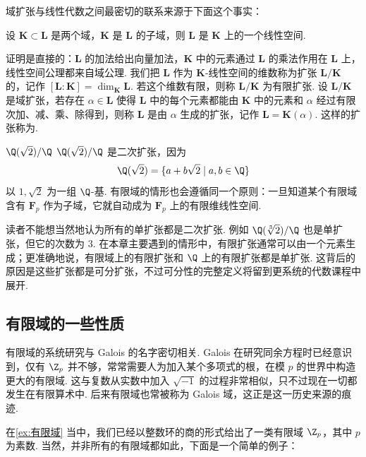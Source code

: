 域扩张与线性代数之间最密切的联系来源于下面这个事实：

\begin{theorem}{}{}
    设 $\mathbf{K} \subset \mathbf{L}$ 是两个域，$\mathbf{K}$ 是 $\mathbf{L}$ 的子域，则 $\mathbf{L}$ 是 $\mathbf{K}$ 上的一个线性空间.
\end{theorem}

证明是直接的：$\mathbf{L}$ 的加法给出向量加法，$\mathbf{K}$ 中的元素通过 $\mathbf{L}$ 的乘法作用在 $\mathbf{L}$ 上，线性空间公理都来自域公理. 我们把 $\mathbf{L}$ 作为 $\mathbf{K}$-线性空间的维数称为扩张 $\mathbf{L}/\mathbf{K}$ 的，记作 $[\mathbf{L}:\mathbf{K}]=\dim_{\mathbf{K}}\mathbf{L}$. 若这个维数有限，则称 $\mathbf{L}/\mathbf{K}$ 为有限扩张. 设 $\mathbf{L}/\mathbf{K}$ 是域扩张，若存在 $\alpha\in\mathbf{L}$ 使得 $\mathbf{L}$ 中的每个元素都能由 $\mathbf{K}$ 中的元素和 $\alpha$ 经过有限次加、减、乘、除得到，则称 $\mathbf{L}$ 是由 $\alpha$ 生成的扩张，记作 $\mathbf{L}=\mathbf{K}(\alpha)$. 这样的扩张称为.

\begin{example}{$\Q(\sqrt{2})/\Q$}{}
    $\Q(\sqrt{2})/\Q$ 是二次扩张，因为
    \[
        \Q(\sqrt{2})=\{a+b\sqrt{2}\mid a,b\in\Q\}
    \]
    以 $1,\sqrt{2}$ 为一组 $\Q$-基. 有限域的情形也会遵循同一个原则：一旦知道某个有限域含有 $\mathbf{F}_p$ 作为子域，它就自动成为 $\mathbf{F}_p$ 上的有限维线性空间.
\end{example}

读者不能想当然地认为所有的单扩张都是二次扩张. 例如 $\Q(\sqrt[3]{2})/\Q$ 也是单扩张，但它的次数为 $3$. 在本章主要遇到的情形中，有限扩张通常可以由一个元素生成；更准确地说，有限域上的有限扩张和 $\Q$ 上的有限扩张都是单扩张. 这背后的原因是这些扩张都是可分扩张，不过可分性的完整定义将留到更系统的代数课程中展开.

\subsection{有限域的一些性质}

有限域的系统研究与 Galois 的名字密切相关. Galois 在研究同余方程时已经意识到，仅有 $\Z_p$ 并不够，常常需要人为加入某个多项式的根，在模 $p$ 的世界中构造更大的有限域. 这与复数从实数中加入 $\sqrt{-1}$ 的过程非常相似，只不过现在一切都发生在有限算术中. 后来有限域也常被称为 Galois 域，这正是这一历史来源的痕迹.

在\autoref{ex:有限域} 当中，我们已经以整数环的商的形式给出了一类有限域 $\Z_p$，其中 $p$ 为素数. 当然，并非所有的有限域都如此，下面是一个简单的例子：

